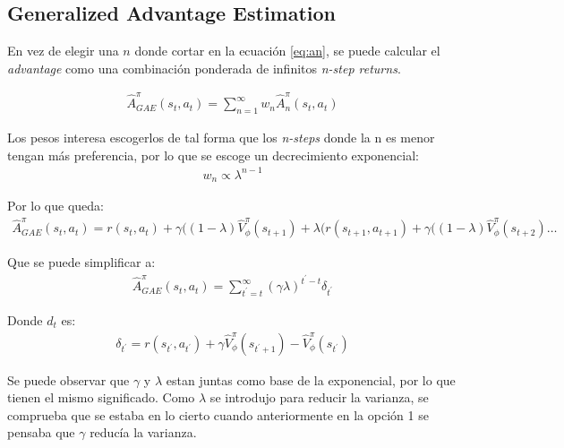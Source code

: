 \subsection{Generalized Advantage Estimation}%
\label{sub:generalized_advantage_estimation}

En vez de elegir una $n$ donde cortar en la ecuación \ref{eq:an}, se puede calcular el
\textit{advantage} como una combinación ponderada de infinitos \textit{n-step returns}.

\begin{align}
\hat { A } _ { GAE } ^ { \pi } ( s _ { t } , a _ { t } ) = \sum _ { n = 1 } ^ { \infty } w _ { n } \hat { A } _ { n } ^ { \pi } ( s _ { t } , a _ { t } )
\end{align}

Los pesos interesa escogerlos de tal forma que los \textit{n-steps} donde la n es menor tengan
más preferencia, por lo que se escoge un decrecimiento exponencial:
\begin{align}
    w_n \propto \lambda^{n-1}
\end{align}

Por lo que queda:
\begin{align}
\hat { A } _ { GAE } ^ { \pi } ( s _ { t } , a _ { t } ) = r ( s _ { t } , a _ { t } ) + \gamma (
( 1 - \lambda ) \hat { V } _ { \phi } ^ { \pi } ( s _ { t + 1 } ) + \lambda ( r ( s _ { t + 1 } ,
a _ { t + 1 } ) + \gamma ( ( 1 - \lambda )\hat{V}_\phi^\pi(s_{t+2})\ldots
\end{align}

Que se puede simplificar a:
\begin{align}
\hat { A } _ { GAE } ^ { \pi } ( s _ { t } , a _ { t } ) = \sum _ { t ^ { \prime } = t } ^ { \infty } ( \gamma \lambda ) ^ { t ^ { \prime } - t } \delta _ { t ^ { \prime } }
\end{align}

Donde $d_t$ es:
 \begin{align}
\delta _ { t ^ { \prime } } = r ( s _ { t ^ { \prime } } , a _ { t ^ { \prime } } ) + \gamma \hat { V } _ { \phi } ^ { \pi } ( s _ { t ^ { \prime } + 1 } ) - \hat { V } _ { \phi } ^ { \pi } ( s _ { t ^ { \prime } } )
\end{align}

Se puede observar que $\gamma$ y $\lambda$ estan juntas como base de la exponencial, por lo que
tienen el mismo significado. Como $\lambda$ se introdujo para reducir la varianza, se
comprueba que se estaba en lo cierto cuando anteriormente en la opción 1 se pensaba que
$\gamma$ reducía la varianza.
